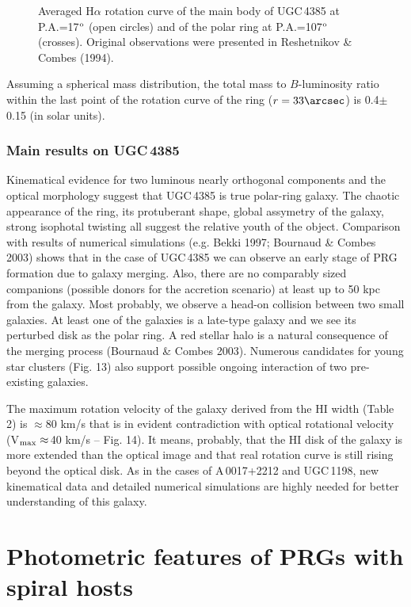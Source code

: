 \documentclass[]{aa}
\begin{document}
\begin{figure}
\centerline{}
\caption{Averaged H$\alpha$ rotation curve of the main body of 
UGC\,4385 at P.A.=17$^{\rm o}$ 
(open circles) and of the polar ring
at P.A.=107$^{\rm o}$ (crosses). Original observations were presented in
Reshetnikov \& Combes (1994). }
\end{figure}

Assuming a spherical mass distribution, the total mass to $B$-luminosity 
ratio within the last point of the rotation curve of the
ring ($r=33\arcsec$) is 0.4$\pm$0.15 (in solar units).

\subsubsection{Main results on UGC\,4385}

Kinematical evidence for two luminous nearly orthogonal components
and the optical morphology suggest that UGC\,4385 is true polar-ring
galaxy. The chaotic appearance of the ring, its protuberant shape,
global assymetry of the
galaxy, strong isophotal twisting all suggest the
relative youth of the object. Comparison with results of numerical
simulations (e.g. Bekki 1997; Bournaud \& Combes 2003) shows that 
in the case of UGC\,4385 we can observe an early stage of PRG 
formation due to galaxy merging. Also, there are no 
comparably sized companions (possible donors for the accretion scenario) 
at least up to 50 kpc from the galaxy.
Most probably, we observe a head-on
collision between two small galaxies. At least one of the galaxies
is a late-type galaxy and we see its perturbed disk as the
polar ring. A red stellar halo is a natural consequence of the merging
process (Bournaud \& Combes 2003). Numerous candidates for young
star clusters (Fig. 13) also support possible ongoing interaction 
of two pre-existing galaxies. 

The maximum rotation velocity of the galaxy derived from the HI
width (Table 2) is $\approx$80 km/s that is in evident contradiction
with optical rotational velocity (V$_{\rm max}\approx$\,40 km/s -- 
Fig. 14). It means, probably, that the HI disk of the galaxy is more
extended than the optical image and that real rotation curve is still
rising beyond the optical disk. As in the cases of A\,0017+2212 and 
UGC\,1198, new kinematical data and detailed numerical
simulations are highly needed for better understanding of this
galaxy. 

\section{Photometric features of PRGs with spiral hosts}
\end{document}
